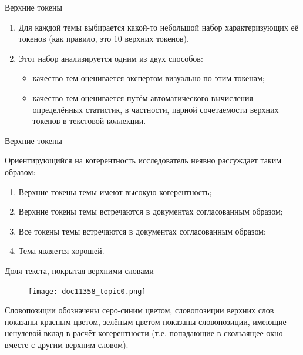 \begin{frame}{Верхние токены}


\begin{enumerate}
    \item Для каждой темы выбирается какой-то небольшой набор характеризующих её токенов (как правило, это 10 верхних токенов).
    \item{Этот набор анализируется одним из двух способов:
    \begin{itemize}
        \item качество тем оценивается экспертом визуально по этим токенам;
        \item качество тем оценивается путём автоматического вычисления определённых статистик, в частности, парной сочетаемости верхних токенов в текстовой коллекции.
    \end{itemize}
    }
\end{enumerate}

\end{frame}

\begin{frame}{Верхние токены}

Ориентирующийся на когерентность исследователь неявно рассуждает таким образом:
\begin{enumerate}
    \item Верхние токены темы имеют высокую когерентность;
    \item Верхние токены темы встречаются в документах согласованным образом;
    \item Все токены темы встречаются в документах согласованным образом;
    \item Тема является хорошей.
\end{enumerate}

\end{frame}
\begin{frame}{Доля текста, покрытая верхними словами}

\begin{figure}
        \texttt{[image: doc11358\_topic0.png]} %
\end{figure}
\vspace{-7pt}
Словопозиции обозначены серо-синим цветом, словопозиции верхних слов показаны красным цветом, зелёным цветом показаны словопозиции, имеющие ненулевой вклад в расчёт когерентности (т.е. попадающие в скользящее окно вместе с другим верхним словом).
\end{frame}

